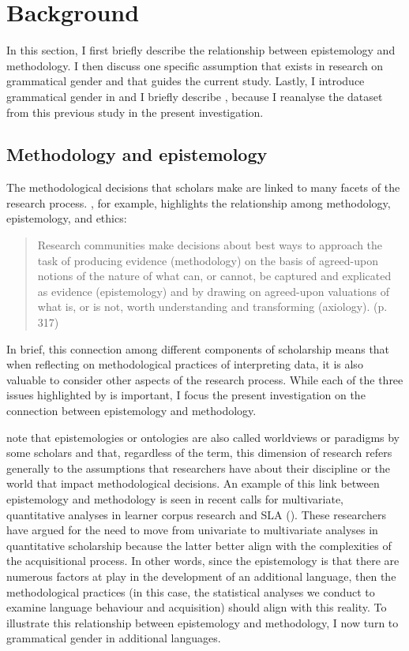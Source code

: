 \documentclass[output=paper,colorlinks,citecolor=brown,modfonts,nonflat]{../langscibook}
\begin{document}
\section{Background}\label{sec:gudmestad:2}

In this section, I first briefly describe the relationship between epistemology and methodology. I then discuss one specific assumption that exists in research on grammatical gender and that guides the current study. Lastly, I introduce grammatical gender in  and I briefly describe \citet{GudmestadEtAl2019}, because I reanalyse the dataset from this previous study in the present investigation.

\subsection{Methodology and epistemology}\label{sec:gudmestad:2.1}

The methodological decisions that scholars make are linked to many facets of the research process. \citet{Ortega2005}, for example, highlights the relationship among methodology, epistemology, and ethics:

\begin{quote}
Research communities make decisions about best ways to approach the task of producing evidence (methodology) on the basis of agreed-upon notions of the nature of what can, or cannot, be captured and explicated as evidence (epistemology) and by drawing on agreed-upon valuations of what is, or is not, worth understanding and transforming (axiology). (p. 317)
\end{quote}

\noindent
In brief, this connection among different components of scholarship means that when reflecting on methodological practices of interpreting data, it is also valuable to consider other aspects of the research process. While each of the three issues highlighted by \citeauthor{Ortega2005} is important, I focus the present investigation on the connection between epistemology and methodology. 



\citet[5]{CreswellCreswell2018} note that epistemologies or ontologies are also called worldviews or paradigms by some scholars and that, regardless of the term, this dimension of research refers generally to the assumptions that researchers have about their discipline or the world that impact methodological decisions. An example of this link between epistemology and methodology is seen in recent calls for multivariate, quantitative analyses in learner corpus research \citep{Gries2015} and SLA (\citealt{PlonskyOswald2017}). These researchers have argued for the need to move from univariate to multivariate analyses in quantitative scholarship because the latter better align with the complexities of the acquisitional process. In other words, since the epistemology is that there are numerous factors at play in the development of an additional language, then the methodological practices (in this case, the statistical analyses we conduct to examine language behaviour and acquisition) should align with this reality. To illustrate this relationship between epistemology and methodology, I now turn to grammatical gender in additional languages. 
\end{document}
